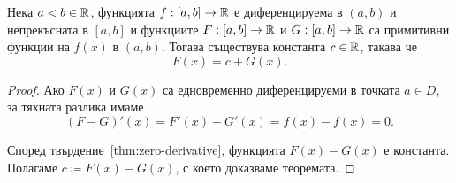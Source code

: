 \documentclass[numbers=endperiod, DIV=15, bibliography=totocnumbered]{scrartcl}
\begin{document}
\begin{theorem}
Нека $a < b \in \mathbb{R}$, функцията $f: [a, b] \to \mathbb{R}$ е диференцируема в $(a, b)$ и непрекъсната в $[a, b]$ и функциите $F: [a, b] \to \mathbb{R}$ и $G: [a, b] \to \mathbb{R}$ са примитивни функции на $f(x)$ в $(a, b)$. Тогава съществува константа $c \in \mathbb{R}$, такава че
  \begin{displaymath}
    F(x) = c + G(x).
  \end{displaymath}
\end{theorem}
\begin{proof}
  Ако $F(x)$ и $G(x)$ са едновременно диференцируеми в точката $a \in D$, за тяхната разлика имаме
  \begin{displaymath}
    (F - G)'(x)
    =
    F'(x) - G'(x)
    =
    f(x) - f(x)
    =
    0.
  \end{displaymath}

  Според твърдение~\ref{thm:zero-derivative}, функцията $F(x) - G(x)$ е константа. Полагаме $c \coloneqq F(x) - G(x)$, с което доказваме теоремата.
\end{proof}

\printbibliography
\end{document}
